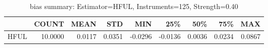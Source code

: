 \begin{table}[ht]
\centering
\caption{bias summary: Estimator=HFUL, Instruments=125, Strength=0.40}
\begin{tabular}{lrrrrrrrr}
\toprule
 & COUNT & MEAN & STD & MIN & 25\% & 50\% & 75\% & MAX \\
\midrule
HFUL & 10.0000 & 0.0117 & 0.0351 & -0.0296 & -0.0136 & 0.0036 & 0.0234 & 0.0867 \\
\bottomrule
\end{tabular}
\end{table}
